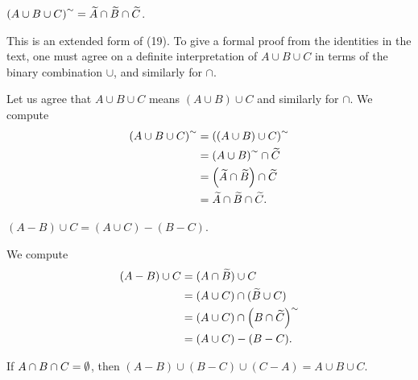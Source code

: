 \begin{exercise}
$\left(A\cup B\cup C\right)^{\sim}= \widetilde{A}\cap \widetilde{B}\cap \widetilde{C}$.

This is an extended form of (19). To give a formal proof from the identities in the text,
one must agree on a definite interpretation of $A\cup B\cup C$ in terms of the binary
combination $\cup$, and similarly for $\cap$.
\end{exercise}

\begin{solution} 
Let us agree that $A\cup B\cup C$ means $(A\cup B)\cup C$ and similarly for $\cap$.
We compute
\[
\begin{aligned}
    \left(A\cup B\cup C\right)^{\sim} &= \left((A\cup B)\cup C\right)^{\sim} \\
    &= \left(A\cup B\right)^{\sim} \cap \widetilde{C} \\
    &= \left(\widetilde{A}\cap \widetilde{B}\right) \cap \widetilde{C} \\
    &= \widetilde{A}\cap \widetilde{B} \cap \widetilde{C}.
\end{aligned}
\]
\end{solution}

\begin{exercise} \label{ex:test}
$(A - B)\cup C = (A\cup C) - (B-C)$.
\end{exercise}

\begin{solution}
We compute
\[
\begin{aligned}
    (A - B)\cup C &= (A\cap \widetilde{B})\cup C \\
    &= (A\cup C)\cap(\widetilde{B}\cup C) \\
    &= (A\cup C)\cap\prn{B\cap \widetilde{C}}^{\sim} \\
    &= (A\cup C)-\prn{B - C}.
\end{aligned}
\]
\end{solution}

\begin{exercise}
If $A\cap B\cap C = \emptyset$, then $(A-B)\cup(B-C)\cup(C-A)=A\cup B\cup C$.
\end{exercise}

